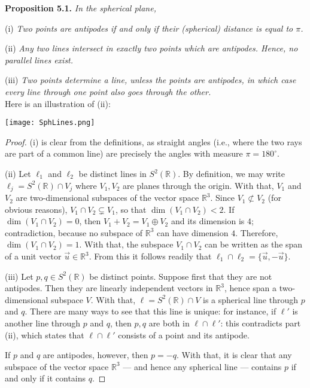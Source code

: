 \documentclass[leqno]{book}
\begin{document}
\noindent\textbf{Proposition 5.1.} \emph{In the spherical plane,}

(i) \emph{Two points are antipodes if and only if their (spherical) distance is equal to $\pi$.} %

(ii) \emph{Any two lines intersect in exactly two points which are antipodes.  Hence, no parallel lines exist.}

(iii) \emph{Two points determine a line, unless the points are antipodes, in which case every line through one point also goes through the other.}\\

\noindent Here is an illustration of (ii):
\begin{center}
\texttt{[image: SphLines.png]}
\end{center}
\begin{proof}
(i) is clear from the definitions, as straight angles (i.e., where the two rays are part of a common line) are precisely the angles with measure $\pi=180^\circ$.

(ii) Let $\ell_1$ and $\ell_2$ be distinct lines in $S^2(\mathbb R)$.  By definition, we may write $\ell_j=S^2(\mathbb R)\cap V_j$ where $V_1,V_2$ are planes through the origin.  With that, $V_1$ and $V_2$ are two-dimensional subspaces of the vector space $\mathbb R^3$.  Since $V_1\not\subset V_2$ (for obvious reasons), $V_1\cap V_2\subsetneq V_1$, so that $\dim(V_1\cap V_2)<2$.  If $\dim(V_1\cap V_2)=0$, then $V_1+V_2=V_1\oplus V_2$ and its dimension is $4$; contradiction, because no subspace of $\mathbb R^3$ can have dimension $4$.  Therefore, $\dim(V_1\cap V_2)=1$.  With that, the subspace $V_1\cap V_2$ can be written as the span of a unit vector $\vec u\in\mathbb R^3$.  From this it follows readily that $\ell_1\cap\ell_2=\{\vec u,-\vec u\}$. %

(iii) Let $p,q\in S^2(\mathbb R)$ be distinct points.  Suppose first that they are not antipodes.  Then they are linearly independent vectors in $\mathbb R^3$, hence span a two-dimensional subspace $V$.  With that, $\ell=S^2(\mathbb R)\cap V$ is a spherical line through $p$ and $q$.  There are many ways to see that this line is unique: for instance, if $\ell'$ is another line through $p$ and $q$, then $p,q$ are both in $\ell\cap\ell'$: this contradicts part (ii), which states that $\ell\cap\ell'$ consists of a point and its antipode.

If $p$ and $q$ are antipodes, however, then $p=-q$.  With that, it is clear that any subspace of the vector space $\mathbb R^3$ \---- and hence any spherical line \---- contains $p$ if and only if it contains $q$. %
\end{proof}
\end{document}
